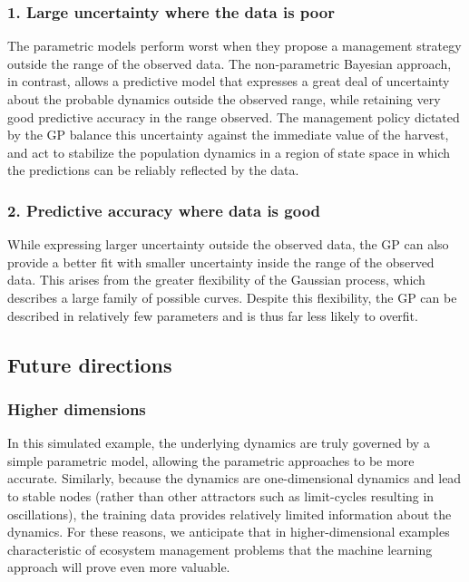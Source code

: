 \documentclass[author-year, review]{elsarticle} %
\begin{document}
\subsubsection{1. Large uncertainty where the data is
poor}\label{large-uncertainty-where-the-data-is-poor}

The parametric models perform worst when they propose a management
strategy outside the range of the observed data. The non-parametric
Bayesian approach, in contrast, allows a predictive model that expresses
a great deal of uncertainty about the probable dynamics outside the
observed range, while retaining very good predictive accuracy in the
range observed. The management policy dictated by the GP balance this
uncertainty against the immediate value of the harvest, and act to
stabilize the population dynamics in a region of state space in which
the predictions can be reliably reflected by the data.

\subsubsection{2. Predictive accuracy where data is
good}\label{predictive-accuracy-where-data-is-good}

While expressing larger uncertainty outside the observed data, the GP
can also provide a better fit with smaller uncertainty inside the range
of the observed data. This arises from the greater flexibility of the
Gaussian process, which describes a large family of possible curves.
Despite this flexibility, the GP can be described in relatively few
parameters and is thus far less likely to overfit.

\subsection{Future directions}\label{future-directions}

\subsubsection{Higher dimensions}\label{higher-dimensions}

In this simulated example, the underlying dynamics are truly governed by
a simple parametric model, allowing the parametric approaches to be more
accurate. Similarly, because the dynamics are one-dimensional dynamics
and lead to stable nodes (rather than other attractors such as
limit-cycles resulting in oscillations), the training data provides
relatively limited information about the dynamics. For these reasons, we
anticipate that in higher-dimensional examples characteristic of
ecosystem management problems that the machine learning approach will
prove even more valuable.
\end{document}
